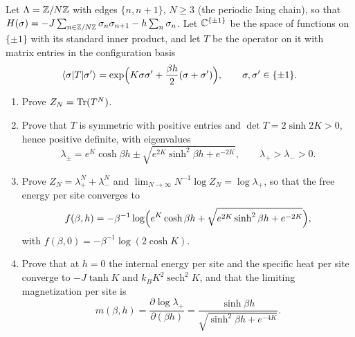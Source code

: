 \begin{exercise}
Let $\Lambda=\mathbb Z/N\mathbb Z$ with edges $\{n,n+1\}$, $N\ge3$ (the periodic Ising
chain), so that
$H(\sigma)=-J\sum_{n\in\mathbb Z/N\mathbb Z}\sigma_n\sigma_{n+1}-h\sum_n\sigma_n$.
Let $\mathbb C^{\{\pm1\}}$ be the space of functions on $\{\pm1\}$ with its standard
inner product, and let $T$ be the operator on it with matrix entries in the
configuration basis
\[
 \langle\sigma|T|\sigma'\rangle=\exp\Bigl(K\sigma\sigma'+\frac{\beta h}2(\sigma+\sigma')\Bigr),
 \qquad\sigma,\sigma'\in\{\pm1\} .
\]
\begin{enumerate}[label=(\alph*)]
\item Prove $Z_N=\operatorname{Tr}(T^N)$.
\item Prove that $T$ is symmetric with positive entries and
$\det T=2\sinh2K>0$, hence positive definite, with eigenvalues
\[
 \lambda_\pm=e^K\cosh\beta h\pm\sqrt{e^{2K}\sinh^2\beta h+e^{-2K}},
 \qquad \lambda_+>\lambda_->0 .
\]
\item Prove $Z_N=\lambda_+^N+\lambda_-^N$ and
$\lim_{N\to\infty}N^{-1}\log Z_N=\log\lambda_+$, so that the free energy per
site converges to
\[
 f(\beta,h)=-\beta^{-1}\log\Bigl(e^K\cosh\beta h+\sqrt{e^{2K}\sinh^2\beta h+e^{-2K}}\Bigr),
\]
with $f(\beta,0)=-\beta^{-1}\log(2\cosh K)$.
\item Prove that at $h=0$ the internal energy per site and the specific heat
per site converge to $-J\tanh K$ and $k_BK^2\operatorname{sech}^2K$, and that
the limiting magnetization per site is
\[
 m(\beta,h)=\frac{\partial\log\lambda_+}{\partial(\beta h)}
 =\frac{\sinh\beta h}{\sqrt{\sinh^2\beta h+e^{-4K}}} .
\]
\end{enumerate}
\end{exercise}

